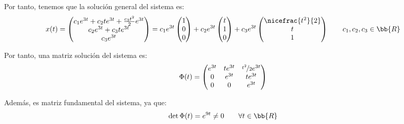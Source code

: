 \documentclass[12pt]{article}
\begin{document}
\begin{ejercicio}
        Por tanto, tenemos que la solución general del sistema es:
        \begin{equation*}
            x(t)=\begin{pmatrix}
                c_1e^{3t}+c_2te^{3t}+\frac{c_3t^2}{2}e^{3t} \\
                c_2e^{3t}+c_3te^{3t} \\
                c_3e^{3t}
            \end{pmatrix}
            = c_1e^{3t}\begin{pmatrix}
                1 \\
                0 \\
                0
            \end{pmatrix}+c_2e^{3t}\begin{pmatrix}
                t \\
                1 \\
                0
            \end{pmatrix}+c_3e^{3t}\begin{pmatrix}
                \nicefrac{t^2}{2} \\
                t \\
                1
            \end{pmatrix}\qquad c_1,c_2,c_3\in\bb{R}
        \end{equation*}

        Por tanto, una matriz solución del sistema es:
        \begin{equation*}
            \Phi(t)=\begin{pmatrix}
                e^{3t} & te^{3t} & \nicefrac{t^2}{2}e^{3t} \\
                0 & e^{3t} & te^{3t} \\
                0 & 0 & e^{3t}
            \end{pmatrix}
        \end{equation*}

        Además, es matriz fundamental del sistema, ya que:
        \begin{equation*}
            \det\Phi(t)=e^{9t}\neq 0\qquad \forall t\in\bb{R}
        \end{equation*}
    \end{ejercicio}
\end{document}
